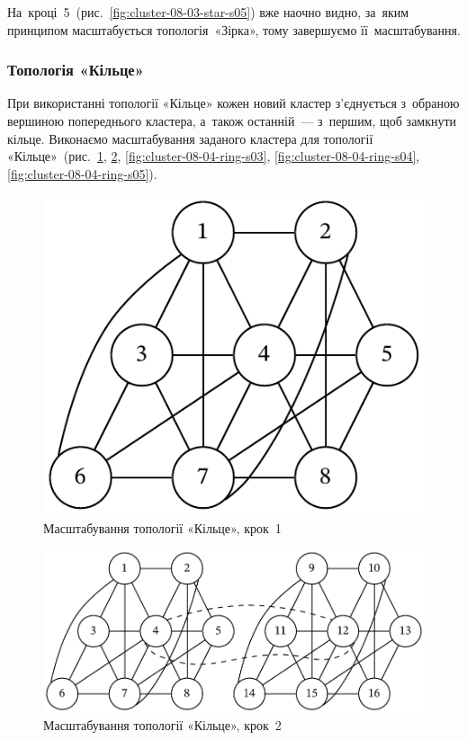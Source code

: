 \documentclass[
	a4paper,
	oneside,
	BCOR = 10mm,
	DIV = 12,
	12pt,
	headings = normal,
]{scrartcl}
\begin{document}
				На~кроці~5~(рис.~\ref{fig:cluster-08-03-star-s05}) вже наочно видно, за~яким принципом масштабується топологія~«Зірка», тому завершуємо її~масштабування.

			\subsubsection{Топологія «Кільце»}
				При використанні топології «Кільце» кожен новий кластер з'єднується з~обраною вершиною попереднього кластера, а~також останній~— з~першим, щоб замкнути кільце. Виконаємо масштабування заданого кластера для топології «Кільце»~(рис.~\ref{fig:cluster-08-04-ring-s01}, \ref{fig:cluster-08-04-ring-s02}, \ref{fig:cluster-08-04-ring-s03}, \ref{fig:cluster-08-04-ring-s04}, \ref{fig:cluster-08-04-ring-s05}).

				\begin{figure}[!htbp]
					\centering
					\includegraphics[height=6\baselineskip]{./assets/cluster-08-01-named.pdf}
					\caption{Масштабування топології «Кільце», крок~1}
					\label{fig:cluster-08-04-ring-s01}
				\end{figure}

				\begin{figure}[!htbp]
					\centering
					\includegraphics[height=6\baselineskip]{./assets/cluster-08-04-ring-s02.pdf}
					\caption{Масштабування топології «Кільце», крок~2}
					\label{fig:cluster-08-04-ring-s02}
				\end{figure}
\end{document}
